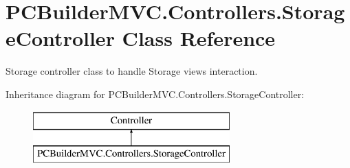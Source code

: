\hypertarget{class_p_c_builder_m_v_c_1_1_controllers_1_1_storage_controller}{}\section{P\+C\+Builder\+M\+V\+C.\+Controllers.\+Storage\+Controller Class Reference}
\label{class_p_c_builder_m_v_c_1_1_controllers_1_1_storage_controller}


Storage controller class to handle Storage views interaction.  


Inheritance diagram for P\+C\+Builder\+M\+V\+C.\+Controllers.\+Storage\+Controller\+:\begin{figure}[H]
\begin{center}
\leavevmode
\includegraphics[height=2.000000cm]{class_p_c_builder_m_v_c_1_1_controllers_1_1_storage_controller}
\end{center}
\end{figure}
